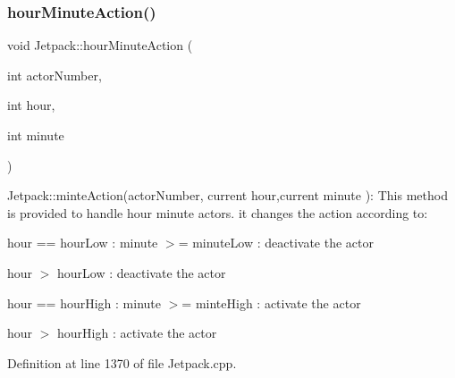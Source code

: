 \subsubsection{\texorpdfstring{hour\+Minute\+Action()}{hourMinuteAction()}}
{\footnotesize\ttfamily void Jetpack\+::hour\+Minute\+Action (\begin{DoxyParamCaption}\item[{int}]{actor\+Number,  }\item[{int}]{hour,  }\item[{int}]{minute }\end{DoxyParamCaption})}

Jetpack\+::minte\+Action(actor\+Number, current hour,current minute )\+: This method is provided to handle hour minute actors. it changes the action according to\+:

hour == hour\+Low \+: minute $>$= minute\+Low \+: deactivate the actor

hour $>$ hour\+Low \+: deactivate the actor

hour == hour\+High \+: minute $>$= minte\+High \+: activate the actor

hour $>$ hour\+High \+: activate the actor 

Definition at line 1370 of file Jetpack.\+cpp.


